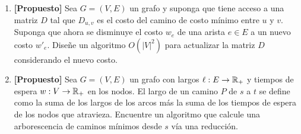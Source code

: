 \begin{enumerate}[label ={\bf P\arabic*}]
	\item \textbf{[Propuesto]} Sea $G = (V,E)$ un grafo y suponga que tiene acceso a una matriz $D$ tal que $D_{u,v}$ es el costo del camino de costo
	mínimo entre $u$ y $v$. Suponga que ahora se disminuye el costo $w_e$ de una arista $e \in E$ a un nuevo costo $w'_e$.
	Diseñe un algoritmo $O(|V|^2)$ para actualizar la matriz $D$ considerando el nuevo costo.

	\item \textbf{[Propuesto]} Sea $G = (V,E)$ un grafo con largos $\ell: E \to \mathbb{R}_+$ y tiempos de espera $w: V \to \mathbb{R}_+$ en los nodos.
	El largo de un camino $P$ de $s$ a $t$ se define como la suma de los largos de los arcos más la suma de los tiempos de
	espera de los nodos que atravieza. Encuentre un algoritmo que calcule una arborescencia de caminos mínimos
	desde $s$ vía una reducción.

\end{enumerate}
